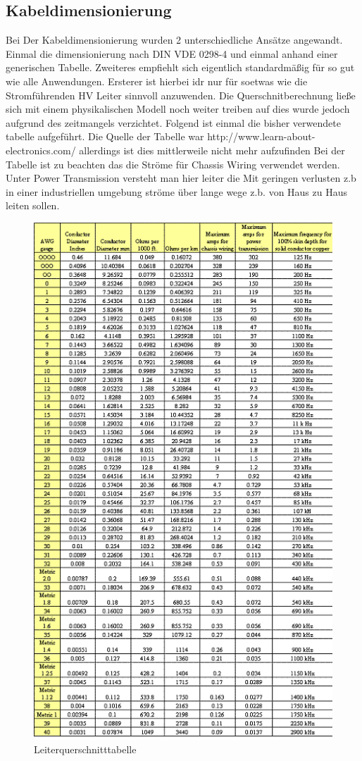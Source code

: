 \subsection{Kabeldimensionierung}
Bei Der Kabeldimensionierung wurden 2 unterschiedliche Ansätze angewandt. Einmal die dimensionierung nach DIN VDE 0298-4 und einmal anhand einer generischen Tabelle. Zweiteres empfiehlt sich eigentlich standardmäßig für so gut wie alle Anwendungen. Ersterer ist hierbei idr nur für soetwas wie die Stromführenden HV Leiter sinnvoll anzuwenden. Die Querschnitberechnung ließe sich mit einem physikalischen Modell noch weiter treiben auf dies wurde jedoch aufgrund des zeitmangels verzichtet.
Folgend ist einmal die bisher verwendete tabelle aufgeführt. Die Quelle der Tabelle war http://www.learn-about-electronics.com/ allerdings ist dies mittlerweile nicht mehr aufzufinden
Bei der Tabelle ist zu beachten das die Ströme für Chassis Wiring verwendet werden. Unter Power Transmission versteht man hier leiter die Mit geringen verlusten z.b in einer industriellen umgebung ströme über lange wege z.b. von Haus zu Haus leiten sollen.
\begin{figure}[h]
	\centering
	\includegraphics[width=0.7\linewidth]{"bilder/Wire thickness"}
	\caption{Leiterquerschnitttabelle}
	\label{fig:wire-thickness}
\end{figure}

